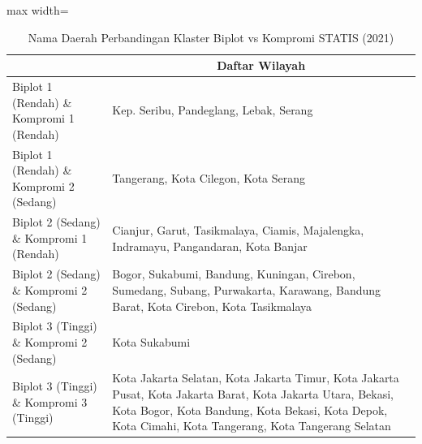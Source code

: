 \begin{table}[H]
\centering
\caption{Nama Daerah Perbandingan Klaster Biplot vs Kompromi STATIS (2021)} \label{tab:app2biplot_comp_name_2021}
\begin{adjustbox}{max width=\textwidth}
\begin{tabular}{|>{\centering\arraybackslash}p{4cm}|p{10cm}|}
\hline
\multicolumn{1}{|c|}{\textbf{Kategori}} & \multicolumn{1}{c|}{\textbf{Daftar Wilayah}} \\
\hline
Biplot 1 (Rendah) \& Kompromi 1 (Rendah) & Kep. Seribu, Pandeglang, Lebak, Serang \\
\hline
Biplot 1 (Rendah) \& Kompromi 2 (Sedang) & Tangerang, Kota Cilegon, Kota Serang \\
\hline
Biplot 2 (Sedang) \& Kompromi 1 (Rendah) & Cianjur, Garut, Tasikmalaya, Ciamis, Majalengka, Indramayu, Pangandaran, Kota Banjar \\
\hline
Biplot 2 (Sedang) \& Kompromi 2 (Sedang) & Bogor, Sukabumi, Bandung, Kuningan, Cirebon, Sumedang, Subang, Purwakarta, Karawang, Bandung Barat, Kota Cirebon, Kota Tasikmalaya \\
\hline
Biplot 3 (Tinggi) \& Kompromi 2 (Sedang) & Kota Sukabumi \\
\hline
Biplot 3 (Tinggi) \& Kompromi 3 (Tinggi) & Kota Jakarta Selatan, Kota Jakarta Timur, Kota Jakarta Pusat, Kota Jakarta Barat, Kota Jakarta Utara, Bekasi, Kota Bogor, Kota Bandung, Kota Bekasi, Kota Depok, Kota Cimahi, Kota Tangerang, Kota Tangerang Selatan \\
\hline
\end{tabular}
\end{adjustbox}
\end{table}